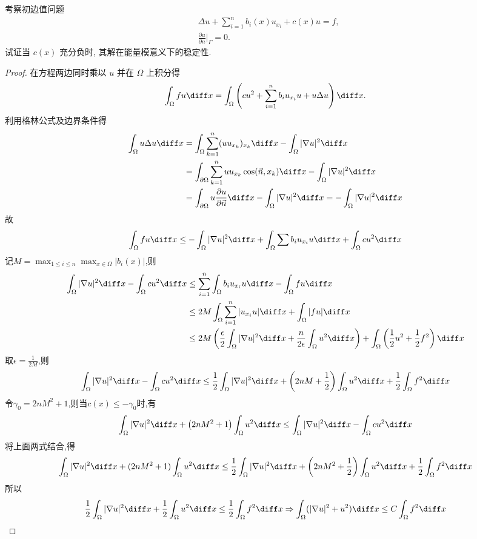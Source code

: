 \begin{exercise}
  考察初边值问题
  \begin{align*}
    & \Delta u + \sum_{i=1}^{n} b_i(x) u_{x_i} + c(x)u = f, \\
    & \frac{\partial u}{\partial n}\bigg|_{\varGamma} = 0.
  \end{align*}
  试证当 $c(x)$ 充分负时, 其解在能量模意义下的稳定性.
\end{exercise}

\begin{proof}
  在方程两边同时乘以 $u$ 并在 $\Omega$ 上积分得
  \[\int_{\Omega}fu\diff x 
    = \int_{\Omega}\left(cu^2+\sum_{i=1}^nb_iu_{x_i}u+u\Delta u\right)\diff x.\]
  利用格林公式及边界条件得
  \[\begin{split}
  \int_{\Omega}u\Delta u\diff x
  &=\int_{\Omega}\sum_{k=1}^n(uu_{x_k})_{x_k}\diff x-\int_{\Omega}|\nabla u|^2\diff x\\
  &=\int_{\partial\Omega}\sum_{k=1}^nuu_{x_k}\cos(\vec{n},x_k)\diff x-\int_{\Omega}|\nabla u|^2\diff x\\
  &=\int_{\partial\Omega}u\frac{\partial u}{\partial\vec{n}}\diff x-\int_{\Omega}|\nabla u|^2\diff x=-\int_{\Omega}|\nabla u|^2\diff x
  \end{split}\]
  故
  \[\int_{\Omega}fu\diff x\leq-\int_{\Omega}|\nabla u|^2\diff x+\int_{\Omega}\sum b_iu_{x_i}u\diff x+\int_{\Omega}cu^2\diff x\]
  记$M=\max_{1\leq i\leq n}\max_{x\in\Omega}|b_i(x)|$,则
  \[\begin{split}
  \int_{\Omega}|\nabla u|^2\diff x-\int_{\Omega}cu^2\diff x
  &\leq\sum_{i=1}^n\int_{\Omega}b_iu_{x_i}u\diff x-\int_{\Omega}fu\diff x\\
  &\leq2M\int_{\Omega}\sum_{i=1}^n|u_{x_i}u|\diff x+\int_{\Omega}|fu|\diff x\\
  &\leq2M\left(\frac{\epsilon}{2}\int_{\Omega}|\nabla u|^2\diff x+\frac{n}{2\epsilon}\int_{\Omega}u^2\diff x\right)+\int_{\Omega}\left(\frac{1}{2}u^2+\frac{1}{2}f^2\right)\diff x
  \end{split}\]
  取$\epsilon=\frac{1}{2M}$,则
  \[\int_{\Omega}|\nabla u|^2\diff x-\int_{\Omega}cu^2\diff x\leq\frac{1}{2}\int_{\Omega}|\nabla u|^2\diff x+\left(2nM+\frac{1}{2}\right)\int_{\Omega}u^2\diff x+\frac{1}{2}\int_{\Omega}f^2\diff x\]
  令$\gamma_0=2nM^2+1$,则当$c(x)\leq-\gamma_0$时,有
  \[\int_{\Omega}|\nabla u|^2\diff x+\left(2nM^2+1\right)\int_{\Omega}u^2\diff x\leq\int_{\Omega}|\nabla u|^2\diff x-\int_{\Omega}cu^2\diff x\]
  将上面两式结合,得
  \[\int_{\Omega}|\nabla u|^2\diff x+(2nM^2+1)\int_{\Omega}u^2\diff x\leq\frac{1}{2}\int_{\Omega}|\nabla u|^2\diff x+\left(2nM^2+\frac{1}{2}\right)\int_{\Omega}u^2\diff x+\frac{1}{2}\int_{\Omega}f^2\diff x\]
  所以
  \[\frac{1}{2}\int_{\Omega}|\nabla u|^2\diff x+\frac{1}{2}\int_{\Omega}u^2\diff x\leq\frac{1}{2}\int_{\Omega}f^2\diff x\Rightarrow\int_{\Omega}(|\nabla u|^2+u^2)\diff x\leq C\int_{\Omega}f^2\diff x\]
\end{proof}